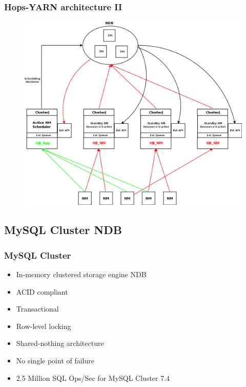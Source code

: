 \documentclass{beamer}
\begin{document}
\begin{frame}
\frametitle{Hops-YARN architecture II}

\begin{figure}
\centering
\includegraphics[scale=0.21]{resources/hopsyarn_arch_components.png}
\end{figure}
\end{frame}

\subsection{MySQL Cluster NDB}
\begin{frame}
\frametitle{MySQL Cluster}
\begin{itemize}
\item In-memory clustered storage engine NDB
\item ACID compliant
\item Transactional
\item Row-level locking
\item Shared-nothing architecture
\item No single point of failure
\item 2.5 Million SQL Ops/Sec for MySQL Cluster 7.4
\end{itemize}
\end{frame}
\end{document}
